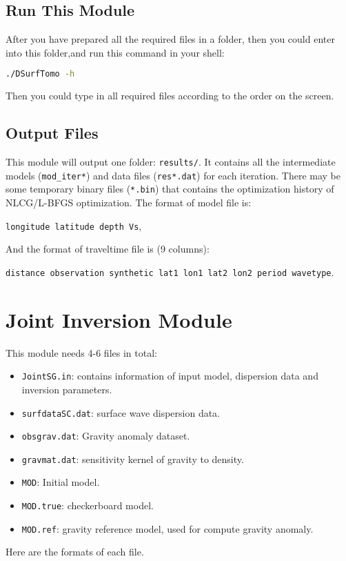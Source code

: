 \documentclass[UTF8]{article}
\begin{document}
\subsection{Run This Module}
After you have prepared all the required files in a folder,
then you could enter into this folder,and run this command
in your shell:
\begin{lstlisting}[language=bash]
./DSurfTomo -h
\end{lstlisting}
Then you could type in all required files according to the 
order on the screen.

\subsection{Output Files}\label{surface wave output files}
This module will output one  folder: \verb!results/!.  It contains all the intermediate models  (\verb!mod_iter*!) and data files (\verb!res*.dat!) for each iteration. There may be some temporary binary files (\verb!*.bin!) that contains the optimization history of NLCG/L-BFGS optimization.
The format of model file is:
\begin{center}
    \texttt{longitude latitude depth Vs},   
\end{center}
And the format of traveltime file is (9 columns): 
\begin{center}
    \small{\texttt{distance observation synthetic lat1 lon1 lat2 lon2 
    period wavetype}}.
\end{center}

\section{Joint Inversion Module}
This module needs 4-6 files in total:
\begin{itemize}
    \item \verb!JointSG.in!: contains information of input model,
            dispersion data and inversion parameters.
    \item \verb!surfdataSC.dat!: surface wave dispersion data.
    \item \verb!obsgrav.dat!: Gravity anomaly dataset.
    \item \verb!gravmat.dat!: sensitivity kernel of 
                gravity to density.
    \item \verb!MOD!: Initial model.
    \item \verb!MOD.true!: checkerboard model.
    \item \texttt{MOD.ref}: gravity reference model, used 
            for compute gravity anomaly.
\end{itemize}
Here are the formats of each file.
\end{document}
